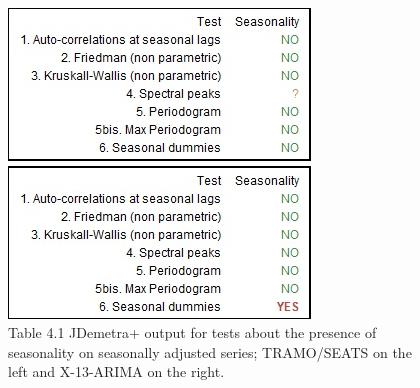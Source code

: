 \documentclass[english,blauw]{cbsdiscussionpaper}
\begin{document}
\begin{figure}[h]
\label{fig:test}
  \begin{minipage}[b]{0.5\textwidth}
    \includegraphics[width=\linewidth]{../images/capitolo4/testTS.jpg}
  \end{minipage}
  \hfill
  \begin{minipage}[b]{0.5\textwidth}
    \includegraphics[width=\linewidth]{../images/capitolo4/testX13.jpg}
  \end{minipage} 
  \caption*{Table 4.1 \quad JDemetra+ output for tests about the presence of seasonality on seasonally adjusted series; TRAMO/SEATS on the left and X-13-ARIMA on the right.}
\end{figure}
\end{document}
